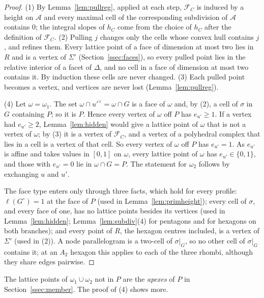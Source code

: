 \begin{proof}
(1) By Lemma~\ref{lem:pullreg}, applied at each step, $\mathcal F_C$ is induced by a height on $\mathcal A$ and every maximal cell of
the corresponding subdivision of $\mathcal A$ contains $0$; the integral slopes of $h_C$ come from the choice of $h_C$ after the
definition of $\mathcal F_C$. (2) Pulling $j$ changes only the cells whose convex hull contains $j$, and refines
them. Every lattice point of a face of dimension at most two lies in $R$ and is a vertex of $\Sigma'$ (Section~\ref{ssec:faces}), so every
pulled point lies in the relative interior of a facet of $\Delta$, and no cell in a face of dimension at most two contains it. By induction
these cells are never changed. (3) Each pulled point becomes a vertex, and vertices are never lost (Lemma~\ref{lem:pullreg}).

(4) Let $\omega=\omega_1$. The set $\omega\cap u'^\vee=\omega\cap G$ is a face of $\omega$ and, by (2), a cell of $\sigma$ in $G$ containing $P$; so it is
$P$. Hence every vertex of $\omega$ off $P$ has $e_{u'}\ge1$. If a vertex had $e_{u'}\ge2$, Lemma~\ref{lem:hidden} would give a lattice point of
$\omega$ that is not a vertex of $\omega$; by (3) it is a vertex of $\mathcal F_C$, and a vertex of a polyhedral complex that lies in a cell is a
vertex of that cell. So every vertex of $\omega$ off $P$ has $e_{u'}=1$. As $e_{u'}$ is affine and takes values in $[0,1]$ on $\omega$, every lattice
point of $\omega$ has $e_{u'}\in\{0,1\}$, and those with $e_{u'}=0$ lie in $\omega\cap G=P$. The statement for $\omega_2$ follows by exchanging $u$
and $u'$.

The face type enters only through three facts, which hold for every profile: $\ell(G^\circ)=1$ at the face of $P$ (used in
Lemma~\ref{lem:primheight}); every cell of $\sigma$, and every face of one, has no lattice points besides its vertices (used in
Lemma~\ref{lem:hidden}; Lemma~\ref{lem:subdiv}(4) for pentagons and for hexagons on both branches); and every point of $R$, the hexagon centres
included, is a vertex of $\Sigma'$ (used in (2)). A node parallelogram is a two-cell of $\sigma|_G$, so no other cell of $\sigma|_G$ contains it; at an
$A_2$ hexagon this applies to each of the three rhombi, although they share edges pairwise.
\end{proof}

The lattice points of $\omega_1\cup\omega_2$ not in $P$ are the \emph{apexes} of $P$ in Section~\ref{ssec:member}. The proof of (4) shows more.

